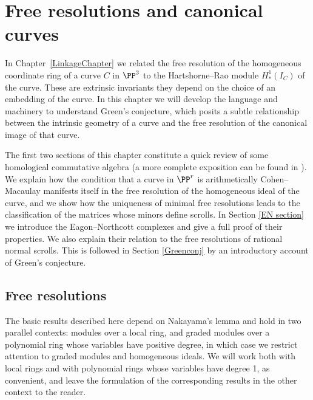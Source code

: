 
\chapter{Free resolutions and canonical curves}
\label{SyzygiesChapter}

\def\length{\mathrm{ length}}

In Chapter~\ref{LinkageChapter} we related the free resolution of the homogeneous
coordinate ring of a curve $C$
in $\PP^3$ to the Hartshorne--Rao module $H^{1}_{*}(I_{C})$ of the curve. These 
are extrinsic invariants \emdash they depend on the choice of an embedding of the curve.
 In this chapter we will develop the
language and machinery to understand Green's conjecture, which posits a
subtle relationship between the intrinsic geometry of a curve and the free resolution
of the canonical image of that curve.

The first two sections of this
chapter constitute a quick review of some
 homological commutative algebra 
(a more complete exposition can be found in \cite[Part III]{Eisenbud1995}).
We
  explain how the condition that a curve
in $\PP^r$ is arithmetically Cohen--Macaulay manifests itself in the
free resolution of the homogeneous ideal of the curve, and we show
how the uniqueness of minimal free resolutions leads to the
classification of the matrices whose minors define 
scrolls. In Section \ref{EN section} we
introduce the Eagon--Northcott complexes and give a full proof of their
properties. We also explain their relation to
the free resolutions of rational normal scrolls. 
This is followed in Section \ref{Greenconj} by an introductory account of 
Green's conjecture.

\section{Free resolutions}

The basic results described here depend on 
Nakayama's lemma and hold 
%
 in two parallel contexts:
modules over a local ring,
%
%
and
graded modules over a polynomial ring
%
%
whose variables have positive degree,  in which case we restrict attention
to graded modules and homogeneous ideals. 
We will work both with local rings and with
polynomial rings whose variables have degree 1,
as convenient, and leave the formulation of the corresponding results
in the other context to the reader.

